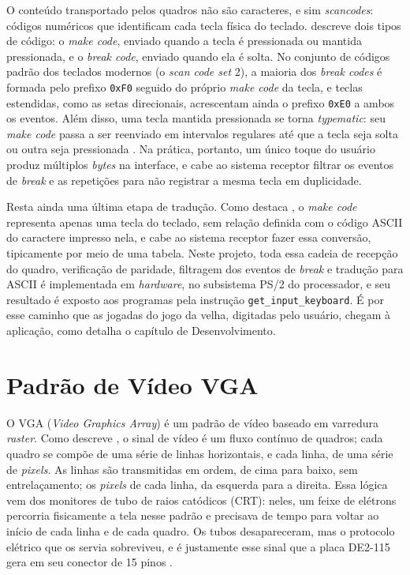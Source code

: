 \documentclass[
	12pt,
	oneside,
	a4paper,
	english,
	french,
	spanish,
	brazil,
	]{abntex2}
\begin{document}
O conteúdo transportado pelos quadros não são caracteres, e sim \emph{scancodes}: códigos numéricos que identificam cada tecla física do teclado.  descreve dois tipos de código: o \emph{make code}, enviado quando a tecla é pressionada ou mantida pressionada, e o \emph{break code}, enviado quando ela é solta. No conjunto de códigos padrão dos teclados modernos (o \emph{scan code set} 2), a maioria dos \emph{break codes} é formada pelo prefixo \texttt{0xF0} seguido do próprio \emph{make code} da tecla, e teclas estendidas, como as setas direcionais, acrescentam ainda o prefixo \texttt{0xE0} a ambos os eventos. Além disso, uma tecla mantida pressionada se torna \emph{typematic}: seu \emph{make code} passa a ser reenviado em intervalos regulares até que a tecla seja solta ou outra seja pressionada \cite{chapweske_ps2}. Na prática, portanto, um único toque do usuário produz múltiplos \emph{bytes} na interface, e cabe ao sistema receptor filtrar os eventos de \emph{break} e as repetições para não registrar a mesma tecla em duplicidade.

Resta ainda uma última etapa de tradução. Como destaca , o \emph{make code} representa apenas uma tecla do teclado, sem relação definida com o código ASCII do caractere impresso nela, e cabe ao sistema receptor fazer essa conversão, tipicamente por meio de uma tabela. Neste projeto, toda essa cadeia de recepção do quadro, verificação de paridade, filtragem dos eventos de \emph{break} e tradução para ASCII é implementada em \emph{hardware}, no subsistema PS/2 do processador, e seu resultado é exposto aos programas pela instrução \texttt{get\_input\_keyboard}. É por esse caminho que as jogadas do jogo da velha, digitadas pelo usuário, chegam à aplicação, como detalha o capítulo de Desenvolvimento.

\section{Padrão de Vídeo VGA}
\label{sec:padrao_vga}
O VGA (\emph{Video Graphics Array}) é um padrão de vídeo baseado em varredura \emph{raster}. Como descreve , o sinal de vídeo é um fluxo contínuo de quadros; cada quadro se compõe de uma série de linhas horizontais, e cada linha, de uma série de \emph{pixels}. As linhas são transmitidas em ordem, de cima para baixo, sem entrelaçamento; os \emph{pixels} de cada linha, da esquerda para a direita. Essa lógica vem dos monitores de tubo de raios catódicos (CRT): neles, um feixe de elétrons percorria fisicamente a tela nesse padrão e precisava de tempo para voltar ao início de cada linha e de cada quadro. Os tubos desapareceram, mas o protocolo elétrico que os servia sobreviveu, e é justamente esse sinal que a placa DE2-115 gera em seu conector de 15 pinos \cite{ManualFPGA}.
\end{document}
